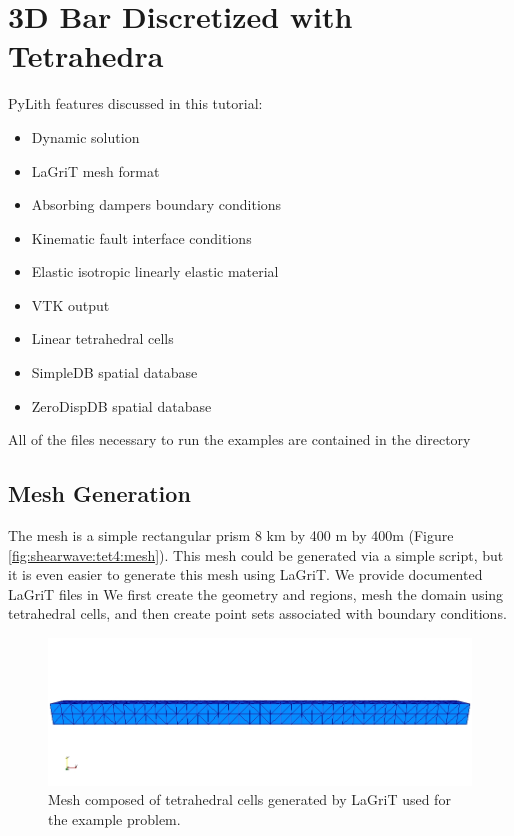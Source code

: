 \section{3D Bar Discretized with Tetrahedra}
\label{sec:example:shearwave:tet4}

PyLith features discussed in this tutorial:
\begin{itemize}
\item Dynamic solution
\item LaGriT mesh format
\item Absorbing dampers boundary conditions
\item Kinematic fault interface conditions
\item Elastic isotropic linearly elastic material
\item VTK output
\item Linear tetrahedral cells
\item SimpleDB spatial database
\item ZeroDispDB spatial database
\end{itemize}
All of the files necessary to run the examples are contained in the
directory 


\subsection{Mesh Generation}

The mesh is a simple rectangular prism 8 km by 400 m by 400m (Figure
\vref{fig:shearwave:tet4:mesh}). This mesh could be generated via
a simple script, but it is even easier to generate this mesh using
LaGriT. We provide documented LaGriT files in 
We first create the geometry and regions, mesh the domain using tetrahedral
cells, and then create point sets associated with boundary conditions.

\begin{figure}
  \includegraphics[scale=0.5]{examples/figs/shearwave_tet4mesh}
  \caption{Mesh composed of tetrahedral cells generated by LaGriT used for the
    example problem.}
  \label{fig:shearwave:tet4:mesh}
\end{figure}


